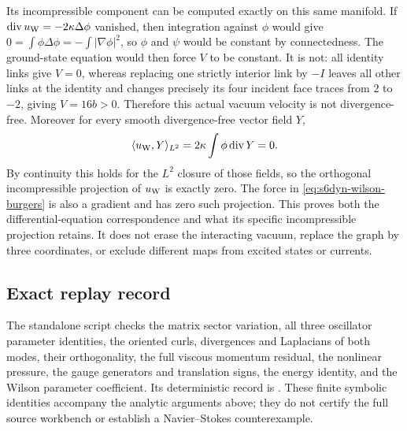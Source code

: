 Its incompressible component can be computed exactly on this same
manifold. If $\operatorname{div}u_{\rm W}=-2\kappa\Delta\phi$ vanished,
then integration against $\phi$ would give
$0=\int\phi\Delta\phi=-\int|\nabla\phi|^2$, so $\phi$ and $\psi$
would be constant by connectedness. The ground-state equation would
then force $V$ to be constant. It is not: all identity links give
$V=0$, whereas replacing one strictly interior link by $-I$ leaves
all other links at the identity and changes precisely its four incident
face traces from $2$ to $-2$, giving $V=16b>0$. Therefore this actual
vacuum velocity is not divergence-free. Moreover for every smooth
divergence-free vector field $Y$,
\[
 \langle u_{\rm W},Y\rangle_{L^2}
   =2\kappa\int\phi\operatorname{div}Y=0.
\]
By continuity this holds for the $L^2$ closure of those fields, so the
orthogonal incompressible projection of $u_{\rm W}$ is exactly zero.
The force in \eqref{eq:s6dyn-wilson-burgers} is also a gradient and has
zero such projection. This proves both the differential-equation
correspondence and what its specific incompressible projection retains.
It does not erase the interacting vacuum, replace the graph by three
coordinates, or exclude different maps from excited states or currents.

\subsection{Exact replay record}

The standalone script  checks the
matrix sector variation, all three oscillator parameter identities,
the oriented curls, divergences and Laplacians of both modes, their
orthogonality, the full viscous momentum residual, the nonlinear
pressure, the gauge generators and translation signs, the energy
identity, and the Wilson parameter coefficient. Its deterministic
record is . These finite symbolic
identities accompany the analytic arguments above; they do not certify
the full source workbench or establish a Navier--Stokes counterexample.
